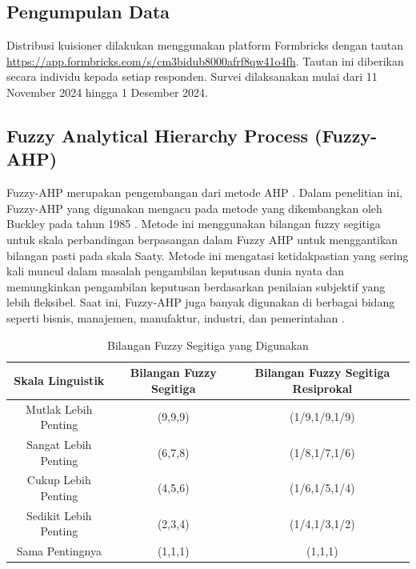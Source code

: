 \documentclass[journal,article,submit,pdftex,moreauthors]{Definitions/mdpi}
\begin{document}
\subsection{Pengumpulan Data}
Distribusi kuisioner dilakukan menggunakan platform Formbricks dengan tautan \url{https://app.formbricks.com/s/cm3bidub8000afrf8qw41o4fh}. Tautan ini diberikan secara individu kepada setiap responden. Survei dilaksanakan mulai dari 11 November 2024 hingga 1 Desember 2024.


\subsection{Fuzzy Analytical Hierarchy Process (Fuzzy-AHP)}

Fuzzy-AHP merupakan pengembangan dari metode AHP \cite{Saaty}. Dalam penelitian ini, Fuzzy-AHP yang digunakan mengacu pada metode yang dikembangkan oleh Buckley pada tahun 1985 \cite{buckley-fahp}. Metode ini menggunakan bilangan fuzzy segitiga untuk skala perbandingan berpasangan dalam Fuzzy AHP untuk menggantikan bilangan pasti pada skala Saaty. Metode ini mengatasi ketidakpastian yang sering kali muncul dalam masalah pengambilan keputusan dunia nyata dan memungkinkan pengambilan keputusan berdasarkan penilaian subjektif yang lebih fleksibel. Saat ini, Fuzzy-AHP juga banyak digunakan di berbagai bidang seperti bisnis, manajemen, manufaktur, industri, dan pemerintahan \cite{fahpbook}.

\begin{table}[H]
    \caption{Bilangan Fuzzy Segitiga yang Digunakan}
    \label{tab:fuzzy-segitiga}
    \centering
    \begin{tabular}{c|c|c}
        \toprule
        \textbf{Skala Linguistik} & \textbf{Bilangan Fuzzy Segitiga} & \textbf{Bilangan Fuzzy Segitiga Resiprokal}\\ 
        \midrule
        \raggedright Mutlak Lebih Penting & (9,9,9) & (1/9,1/9,1/9) \\ 
        \midrule
        \raggedright Sangat Lebih Penting & (6,7,8) & (1/8,1/7,1/6) \\ 
        \midrule
        \raggedright Cukup Lebih Penting & (4,5,6) & (1/6,1/5,1/4) \\ 
        \midrule
        \raggedright Sedikit Lebih Penting & (2,3,4) & (1/4,1/3,1/2) \\ 
        \midrule
        \raggedright Sama Pentingnya & (1,1,1) & (1,1,1) \\ 
        \bottomrule
    \end{tabular}
\end{table}
\end{document}
